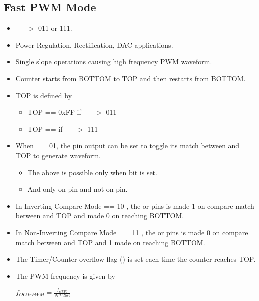 \subsection{Fast PWM Mode}
\begin{itemize}
    \item {} $-->$ 011 or 111.
    \item Power Regulation, Rectification, DAC applications.
    \item Single slope operations causing high frequency PWM waveform.
    \item Counter starts from BOTTOM to TOP and then restarts from BOTTOM.
    \item TOP is defined by
    \begin{itemize}
        \item TOP == 0xFF if  $-->$ 011
        \item TOP ==  if  $-->$ 111
    \end{itemize}
    \item  When  == 01, the  pin output can be set to toggle its match between  and TOP to generate waveform.
    \begin{itemize}
        \item The above is possible only when  bit is set.
        \item And only on  pin and not on  pin.
    \end{itemize}
    \item In Inverting Compare Mode  == 10 , the  or  pins is made 1 on compare match between  and TOP and made 0 on reaching BOTTOM.
    \item In Non-Inverting Compare Mode  == 11 , the  or  pins is made 0 on compare match between  and TOP and 1 made  on reaching BOTTOM.
    \item The Timer/Counter overflow flag () is set each time the counter reaches TOP.
    \item The PWM frequency is given by 
    \begin{center}
        { \Large $f_{OC0xPWM} = \frac{f_{clkT0}}{N * 256}$ }
    \end{center}
\end{itemize}

